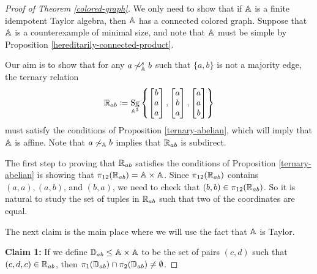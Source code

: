 \documentclass[letterpaper,11pt]{article}
\DeclareMathOperator{\Sg}{Sg}
\begin{document}
\begin{proof}[Proof of Theorem \ref{colored-graph}] We only need to show that if $\mathbb{A}$ is a finite idempotent Taylor algebra, then $\mathbb{A}$ has a connected colored graph. Suppose that $\mathbb{A}$ is a counterexample of minimal size, and note that $\mathbb{A}$ must be simple by Proposition \ref{hereditarily-connected-product}.

Our aim is to show that for any $a \not\sim^s_{\mathbb{A}} b$ such that $\{a,b\}$ is not a majority edge, the ternary relation
\[
\RR_{ab} \coloneqq \Sg_{\bA^3}\left\{\begin{bmatrix} b\\ a\\ a\end{bmatrix}, \begin{bmatrix} a\\ b\\ a\end{bmatrix}, \begin{bmatrix} a\\ a\\ b\end{bmatrix}\right\}
\]
must satisfy the conditions of Proposition \ref{ternary-abelian}, which will imply that $\mathbb{A}$ is affine. Note that $a \not\sim_{\mathbb{A}} b$ implies that $\mathbb{R}_{ab}$ is subdirect.

The first step to proving that $\mathbb{R}_{ab}$ satisfies the conditions of Proposition \ref{ternary-abelian} is showing that $\pi_{12}(\mathbb{R}_{ab}) = \mathbb{A} \times \mathbb{A}$. Since $\pi_{12}(\mathbb{R}_{ab})$ contains $(a,a), (a,b)$, and $(b,a)$, we need to check that $(b,b) \in \pi_{12}(\mathbb{R}_{ab})$. So it is natural to study the set of tuples in $\mathbb{R}_{ab}$ such that two of the coordinates are equal.

The next claim is the main place where we will use the fact that $\mathbb{A}$ is Taylor.

{\bf Claim 1:} If we define $\mathbb{D}_{ab} \le \mathbb{A}\times\mathbb{A}$ to be the set of pairs $(c,d)$ such that $(c,d,c) \in \mathbb{R}_{ab}$, then $\pi_1(\mathbb{D}_{ab}) \cap \pi_2(\mathbb{D}_{ab}) \ne \emptyset$.


\end{proof}
\end{document}
